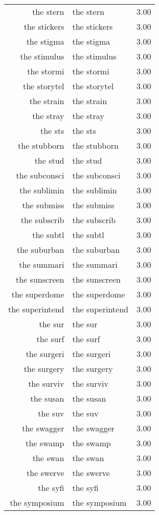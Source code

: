 \begin{table}[ht]
\begin{tabular}{rlr}
  the stern & the stern & 3.00 \\ 
  the stickers & the stickers & 3.00 \\ 
  the stigma & the stigma & 3.00 \\ 
  the stimulus & the stimulus & 3.00 \\ 
  the stormi & the stormi & 3.00 \\ 
  the storytel & the storytel & 3.00 \\ 
  the strain & the strain & 3.00 \\ 
  the stray & the stray & 3.00 \\ 
  the sts & the sts & 3.00 \\ 
  the stubborn & the stubborn & 3.00 \\ 
  the stud & the stud & 3.00 \\ 
  the subconsci & the subconsci & 3.00 \\ 
  the sublimin & the sublimin & 3.00 \\ 
  the submiss & the submiss & 3.00 \\ 
  the subscrib & the subscrib & 3.00 \\ 
  the subtl & the subtl & 3.00 \\ 
  the suburban & the suburban & 3.00 \\ 
  the summari & the summari & 3.00 \\ 
  the sunscreen & the sunscreen & 3.00 \\ 
  the superdome & the superdome & 3.00 \\ 
  the superintend & the superintend & 3.00 \\ 
  the sur & the sur & 3.00 \\ 
  the surf & the surf & 3.00 \\ 
  the surgeri & the surgeri & 3.00 \\ 
  the surgery & the surgery & 3.00 \\ 
  the surviv & the surviv & 3.00 \\ 
  the susan & the susan & 3.00 \\ 
  the suv & the suv & 3.00 \\ 
  the swagger & the swagger & 3.00 \\ 
  the swamp & the swamp & 3.00 \\ 
  the swan & the swan & 3.00 \\ 
  the swerve & the swerve & 3.00 \\ 
  the syfi & the syfi & 3.00 \\ 
  the symposium & the symposium & 3.00 \\ 

\end{tabular}
\end{table}
